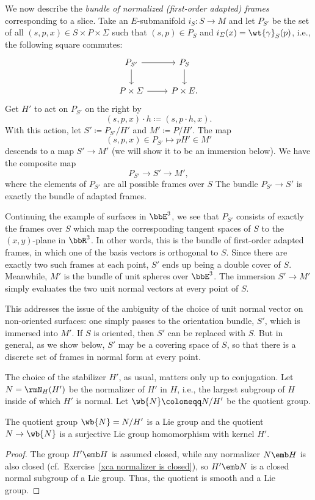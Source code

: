 We now describe the \emph{bundle of normalized (first-order adapted) frames} corresponding to a slice. Take an $E$-submanifold $i_S:S\to M$ and let $P_{S'}$ be the set of all $(s,p,x)\in S\times P\times \varSigma$ such that $(s,p)\in P_S$ and $i_\varSigma(x)=\wt{\gamma}_S(p)$, i.e., the following square commutes:
\[\begin{tikzcd}
    P_{S'}\arrow[r]\arrow[d] & P_S\arrow[d]\\
    P\times\varSigma \arrow[r] & P\times E.
\end{tikzcd}\]
Get $H'$ to act on $P_{S'}$ on the right by 
\[(s,p,x)\cdot h\coloneqq (s,p\cdot h,x).\]
With this action, let $S'\coloneqq P_{S'}\slash H'$ and $M'\coloneqq P\slash H'$. The map 
\[(s,p,x)\in P_{S'}\mapsto pH'\in M'\]
descends to a map $S'\to M'$ (we will show it to be an immersion below). We have the composite map
\[P_{S'}\to S'\to M',\]
where the elements of $P_{S'}$ are all possible frames over $S$
The bundle $P_{S'}\to S'$ is exactly the bundle of adapted frames.

\begin{example}
    Continuing the example of surfaces in $\bbE^3$, we see that $P_{S'}$ consists of exactly the frames over $S$ which map the corresponding tangent spaces of $S$ to the $(x,y)$-plane in $\bbR^3$. In other words, this is the bundle of first-order adapted frames, in which one of the basis vectors is orthogonal to $S$. Since there are exactly two such frames at each point, $S'$ ends up being a double cover of $S$. Meanwhile, $M'$ is the bundle of unit spheres over $\bbE^3$. The immersion $S'\to M'$ simply evaluates the two unit normal vectors at every point of $S$. 
    
    This addresses the issue of the ambiguity of the choice of unit normal vector on non-oriented surfaces: one simply passes to the orientation bundle, $S'$, which is immersed into $M'$. If $S$ is oriented, then $S'$ can be replaced with $S$. But in general, as we show below, $S'$ may be a covering space of $S$, so that there is a discrete set of frames in normal form at every point.
\end{example}


The choice of the stabilizer $H'$, as usual, matters only up to conjugation. Let $N=\rmN_H(H')$ be the normalizer of $H'$ in $H$, i.e., the largest subgroup of $H$ inside of which $H'$ is normal. Let $\wb{N}\coloneqq N\slash H'$ be the quotient group.

\begin{lem}
    The quotient group $\wb{N}=N\slash H'$ is a Lie group and the quotient $N\to \wb{N}$ is a surjective Lie group homomorphism with kernel $H'$.
\end{lem}
\begin{proof}
    The group $H'\emb H$ is assumed closed, while any normalizer $N\emb H$ is also closed (cf.\ Exercise~\ref{xca normalizer is closed}), so $H'\emb N$ is a closed normal subgroup of a Lie group. Thus, the quotient is smooth and a Lie group.
\end{proof}

